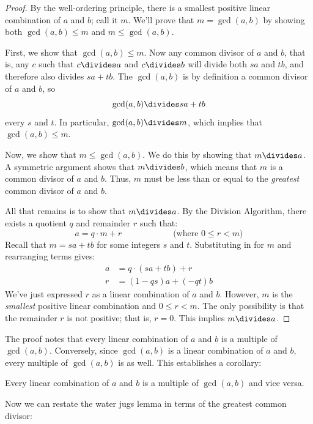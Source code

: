 \begin{proof}
By the well-ordering principle, there is a smallest positive linear
combination of $a$ and $b$; call it $m$.  We'll prove that $m = \gcd(a,
b)$ by showing both $\gcd(a, b) \leq m$ and $m \leq \gcd(a, b)$.

First, we show that $\gcd(a, b) \leq m$.  Now any common divisor of $a$
and $b$, that is, any $c$ such that $c \divides a$ and $c \divides b$ will
divide both $sa$ and $tb$, and therefore also divides $sa+tb$.   The
$\gcd(a, b)$ is by definition a common divisor of $a$ and $b$, so
%
\[
\gcd(a, b) \divides s a + t b
\]
every $s$ and $t$.
%
In particular, $\gcd(a, b) \divides m$, which implies that $\gcd(a, b)
\leq m$.

Now, we show that $m \leq \gcd(a, b)$.  We do this by showing that $m
\divides a$.  A symmetric argument shows that $m \divides b$, which means
that $m$ is a common divisor of $a$ and $b$.  Thus, $m$ must be less than
or equal to the \emph{greatest} common divisor of $a$ and $b$.

All that remains is to show that $m \divides a$.  By the Division
Algorithm, there exists a quotient $q$ and remainder $r$ such that:
%
\[
a = q \cdot m + r \hspace{1in} \text{(where $0 \leq r < m$)}
\]
%
Recall that $m = s a + t b$ for some integers $s$ and $t$.
Substituting in for $m$ and rearranging terms gives:
%
\begin{align*}
a & = q \cdot (s a + t b) + r \\
r & = (1 - qs) a + (-qt) b
\end{align*}
%
We've just expressed $r$ as a linear combination of $a$ and $b$.
However, $m$ is the \emph{smallest} positive linear combination and
$0 \leq r < m$.  The only possibility is that the remainder $r$ is not
positive; that is, $r = 0$.  This implies $m \divides a$.
\end{proof}

The proof notes that every linear combination of $a$ and $b$ is a
multiple of $\gcd(a, b)$.  Conversely, since $\gcd(a, b)$ is a linear
combination of $a$ and $b$, every multiple of $\gcd(a, b)$ is as well.
This establishes a corollary:

\begin{corollary}
\label{cor:lin-comb}
Every linear combination of $a$ and $b$ is a multiple of $\gcd(a, b)$
and vice versa.
\end{corollary}

Now we can restate the water jugs lemma in terms of the greatest
common divisor:

